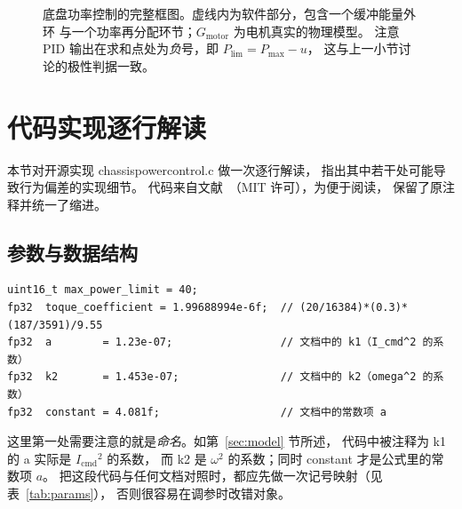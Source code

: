 \documentclass[cn,blue,11pt,device=normal]{elegantnote}
\newcommand{\code}[1]{{\ttfamily\small\def\_{\textunderscore\allowbreak}#1}}
\newcommand{\Pin}{P_{\mathrm{in}}{}}
\newcommand{\Icmd}{I_{\mathrm{cmd}}{}}
\newcommand{\Ebuf}{E_{\mathrm{buf}}{}}
\newcommand{\Plim}{P_{\mathrm{lim}}{}}
\newcommand{\Pmax}{P_{\max}{}}
\begin{document}
\begin{figure}[htbp]
  \caption{底盘功率控制的完整框图。虚线内为软件部分，包含一个缓冲能量外环
  与一个功率再分配环节；$G_{\mathrm{motor}}$ 为电机真实的物理模型。
  注意 PID 输出在求和点处为\emph{负}号，即 $\Plim = \Pmax - u$，
  这与上一小节讨论的极性判据一致。}
  \label{fig:blockdiagram}
\end{figure}

\section{代码实现逐行解读}\label{sec:code}

本节对开源实现 \code{chassis\_power\_control.c} 做一次逐行解读，
指出其中若干处可能导致行为偏差的实现细节。
代码来自文献~\cite{lin2023report,lin2023code}（MIT 许可），为便于阅读，
保留了原注释并统一了缩进。

\subsection{参数与数据结构}

\begin{lstlisting}[style=cstyle, numbers=none]
uint16_t max_power_limit = 40;
fp32  toque_coefficient = 1.99688994e-6f;  // (20/16384)*(0.3)*(187/3591)/9.55
fp32  a        = 1.23e-07;                 // 文档中的 k1（I_cmd^2 的系数）
fp32  k2       = 1.453e-07;                // 文档中的 k2（omega^2 的系数）
fp32  constant = 4.081f;                   // 文档中的常数项 a
\end{lstlisting}

这里第一处需要注意的就是\emph{命名}。如第~\ref{sec:model} 节所述，
代码中被注释为 \code{k1} 的 \code{a} 实际是 $\Icmd^2$ 的系数，
而 \code{k2} 是 $\omega^2$ 的系数；同时 \code{constant} 才是公式里的常数项 $a$。
把这段代码与任何文档对照时，都应先做一次记号映射（见表~\ref{tab:params}），
否则很容易在调参时改错对象。
\end{document}
